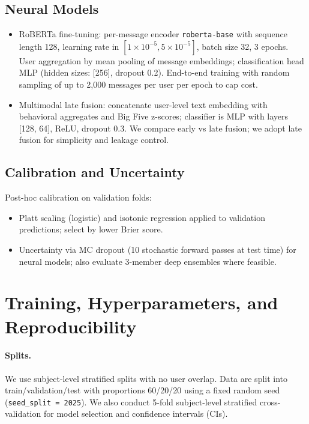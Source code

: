 \subsection{Neural Models}
\begin{itemize}
  \item RoBERTa fine-tuning: per-message encoder \texttt{roberta-base} with sequence length 128, learning rate in \([1\times10^{-5}, 5\times10^{-5}]\), batch size 32, 3 epochs. User aggregation by mean pooling of message embeddings; classification head MLP (hidden sizes: [256], dropout 0.2). End-to-end training with random sampling of up to 2,000 messages per user per epoch to cap cost.
  \item Multimodal late fusion: concatenate user-level text embedding with behavioral aggregates and Big Five z-scores; classifier is MLP with layers [128, 64], ReLU, dropout 0.3. We compare early vs late fusion; we adopt late fusion for simplicity and leakage control.
\end{itemize}

\subsection{Calibration and Uncertainty}
\label{sec:methods-calibration}
Post-hoc calibration on validation folds:
\begin{itemize}
  \item Platt scaling (logistic) and isotonic regression applied to validation predictions; select by lower Brier score.
  \item Uncertainty via MC dropout (10 stochastic forward passes at test time) for neural models; also evaluate 3-member deep ensembles where feasible.
\end{itemize}

\section{Training, Hyperparameters, and Reproducibility}
\label{sec:methods-training}
\paragraph{Splits.} We use subject-level stratified splits with no user overlap. Data are split into train/validation/test with proportions 60/20/20 using a fixed random seed (\verb|seed_split = 2025|). We also conduct 5-fold subject-level stratified cross-validation for model selection and confidence intervals (CIs).

